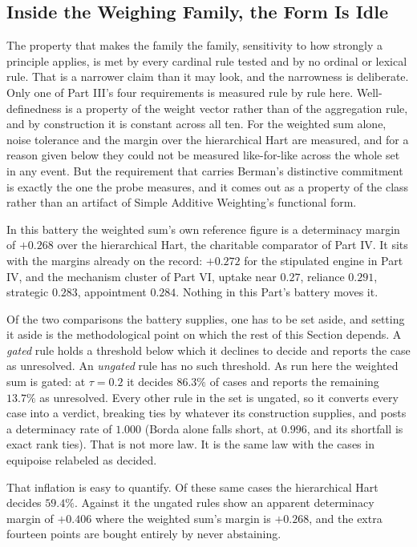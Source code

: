 \subsection{Inside the Weighing Family, the Form Is Idle}

The property that makes the family the family, sensitivity to how
strongly a principle applies, is met by every cardinal rule tested and by
no ordinal or lexical rule. That is a narrower claim than it may look, and the narrowness is
deliberate. Only one of Part III's four requirements is measured rule by
rule here. Well-definedness is a property of the weight vector rather than
of the aggregation rule, and by construction it is constant across all ten. For the weighted sum alone, noise tolerance and the margin over the
hierarchical Hart are measured, and for a reason given below they could not
be measured like-for-like across the whole set in any event. But the requirement that carries Berman's
distinctive commitment is exactly the one the probe measures, and it
comes out as a property of the class rather than an artifact of Simple
Additive Weighting's functional form.

In this battery the weighted sum's own reference figure is a determinacy
margin of $+0.268$ over the hierarchical Hart, the charitable comparator of Part IV. It sits with the margins already on the record: $+0.272$
for the stipulated engine in Part IV, and the mechanism cluster of Part
VI, uptake near $0.27$, reliance $0.291$, strategic $0.283$, appointment
$0.284$. Nothing in this Part's battery moves it.

Of the two comparisons the battery supplies, one has to be set aside, and
setting it aside is the methodological point on which the rest of this
Section depends. A \textit{gated} rule holds a threshold below which it
declines to decide and reports the case as unresolved. An \textit{ungated}
rule has no such threshold. As run here the weighted sum is gated: at $\tau = 0.2$ it decides $86.3\%$
of cases and reports the remaining $13.7\%$ as unresolved. Every other rule
in the set is ungated, so it converts every case into a verdict, breaking
ties by whatever its construction supplies, and posts a determinacy rate of
$1.000$ (Borda alone falls short, at $0.996$, and its shortfall is exact
rank ties). That is not more law. It is the same law with the cases in
equipoise relabeled as decided.

That inflation is easy to quantify. Of these same cases the hierarchical
Hart decides $59.4\%$. Against it the ungated rules show an apparent
determinacy margin of $+0.406$ where the weighted sum's margin is
$+0.268$, and the extra fourteen points are bought entirely by never
abstaining.


